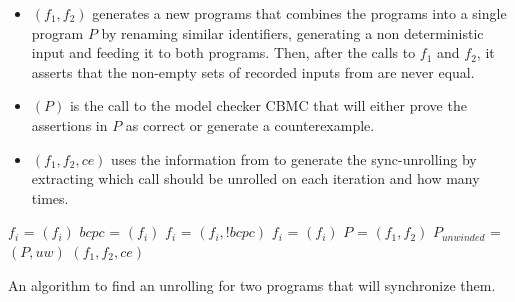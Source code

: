 \begin{itemize}
    \item {}$(f_1,f_2)$ generates a new programs that combines the programs into a single program $P$ by renaming similar identifiers, generating a non deterministic input and feeding it to both programs. Then, after the calls to $f_1$ and $f_2$, it asserts that the non-empty sets of recorded inputs from  are never equal.
\iffalse    
    as shown in figure \ref{fig:findcutverfprogram}.
  \begin{figure} [h]
\begin{center}
\begin{minipage}{7 cm}
\begin{lstlisting}[escapeinside={(*}{*)}]
i = non_det()
input_set(*$_1$*) = input_set(*$_2$*) = {}
res1 = (*$f_1$*)(i)
res2 = (*$f_2$*)(i)
assume(input_set(*$_1$*).size > 1 && input_set(*$_2$*).size > 1)
assert(input_set(*$_1$*) != input_set(*$_2$*))
\end{lstlisting}
\end{minipage}
\caption{The program $P$ generated in line~\ref{step:create} of Algorithm~\ref{alg:Findunrolling}. There is an input\_set array for each variable $f_1$ and $f_2$ receives as input.}
\label{fig:findcutverfprogram}
\end{center}
\end{figure}
  \fi
\item {}$(P)$ is the call to the model checker CBMC that will either prove the assertions in $P$ as correct or generate a counterexample.
\item {}$(f_1,f_2,ce)$ uses the information from  to generate the sync-unrolling by extracting which call should be unrolled on each iteration and how many times. 
\end{itemize}  

\noindent
\begin{algorithm}
\begin{minipage}{\linewidth}
\begin{algorithmic}[1]
    \label{step:foreach_p} \label{step:setupforsu}
    \State $f_i$ = $(f_i)$\label{step:depth_tracking}
    \State $bcpc$ = $(f_i)$\label{step:get_bcpc}
    \State $f_i$ = $(f_i,!bcpc)$\label{step:block_bc}
    \State $f_i$ = $(f_i)$
    \EndFor
    \State $P$ = $(f_1,f_2)$\label{step:create}
        \State $P_{unwinded}$ = $(P,uw)$
        \State \Return {}$(f_1,f_2,ce)$
        \EndIf
    \EndFor
\EndFunction
\end{algorithmic}
\end{minipage}
\caption{An algorithm to find an unrolling for two programs that will synchronize them.}
\label{alg:Findunrolling}
\end{algorithm}

